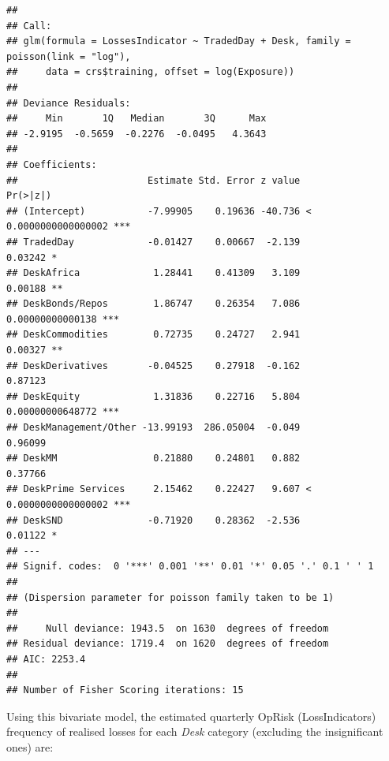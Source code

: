 \documentclass{DissertateUSU}
\begin{document}
\begin{verbatim}
## 
## Call:
## glm(formula = LossesIndicator ~ TradedDay + Desk, family = poisson(link = "log"), 
##     data = crs$training, offset = log(Exposure))
## 
## Deviance Residuals: 
##     Min       1Q   Median       3Q      Max  
## -2.9195  -0.5659  -0.2276  -0.0495   4.3643  
## 
## Coefficients:
##                       Estimate Std. Error z value             Pr(>|z|)    
## (Intercept)           -7.99905    0.19636 -40.736 < 0.0000000000000002 ***
## TradedDay             -0.01427    0.00667  -2.139              0.03242 *  
## DeskAfrica             1.28441    0.41309   3.109              0.00188 ** 
## DeskBonds/Repos        1.86747    0.26354   7.086     0.00000000000138 ***
## DeskCommodities        0.72735    0.24727   2.941              0.00327 ** 
## DeskDerivatives       -0.04525    0.27918  -0.162              0.87123    
## DeskEquity             1.31836    0.22716   5.804     0.00000000648772 ***
## DeskManagement/Other -13.99193  286.05004  -0.049              0.96099    
## DeskMM                 0.21880    0.24801   0.882              0.37766    
## DeskPrime Services     2.15462    0.22427   9.607 < 0.0000000000000002 ***
## DeskSND               -0.71920    0.28362  -2.536              0.01122 *  
## ---
## Signif. codes:  0 '***' 0.001 '**' 0.01 '*' 0.05 '.' 0.1 ' ' 1
## 
## (Dispersion parameter for poisson family taken to be 1)
## 
##     Null deviance: 1943.5  on 1630  degrees of freedom
## Residual deviance: 1719.4  on 1620  degrees of freedom
## AIC: 2253.4
## 
## Number of Fisher Scoring iterations: 15
\end{verbatim}

\doublespacing

Using this bivariate model, the estimated quarterly OpRisk
(LossIndicators) frequency of realised losses for each \emph{Desk}
category (excluding the insignificant ones) are:
\end{document}
